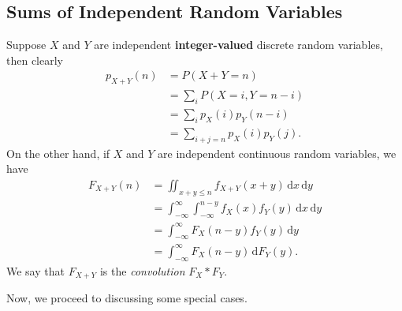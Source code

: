 \documentclass[math]{amznotes}
\theoremstyle{remark}
\begin{document}
\subsection{Sums of Independent Random Variables}
Suppose $X$ and $Y$ are independent \textbf{integer-valued} discrete random variables, then clearly
\begin{align*}
    p_{X + Y}(n) & = P(X + Y = n) \\
    & = \sum_{i}P(X = i, Y = n - i) \\
    & = \sum_{i}p_X(i)p_Y(n - i) \\
    & = \sum_{i + j = n}p_X(i)p_Y(j).
\end{align*}
On the other hand, if $X$ and $Y$ are independent continuous random variables, we have
\begin{align*}
    F_{X + Y}(n) & = \iint_{x + y \leq n}\!f_{X + Y}(x + y)\,\mathrm{d}x\,\mathrm{d}y \\
    & = \int_{-\infty}^{\infty}\int_{-\infty}^{n - y}\!f_X(x)f_Y(y)\,\mathrm{d}x\,\mathrm{d}y \\
    & = \int_{-\infty}^{\infty}\!F_X(n - y)f_Y(y)\,\mathrm{d}y \\
    & = \int_{-\infty}^{\infty}\!F_X(n - y)\,\mathrm{d}F_Y(y).
\end{align*}
We say that $F_{X + Y}$ is the \textit{convolution} $F_X * F_Y$.

Now, we proceed to discussing some special cases.
\end{document}
